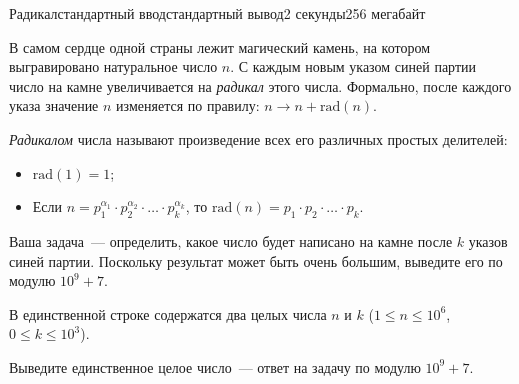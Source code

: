\begin{problem}{Радикал}{стандартный ввод}{стандартный вывод}{2 секунды}{256 мегабайт}

В самом сердце одной страны лежит магический камень, на котором выгравировано натуральное число $n$. С каждым новым указом синей партии число на камне увеличивается на \textit{радикал} этого числа. Формально, после каждого указа значение $n$ изменяется по правилу: $n \rightarrow n + \text{rad}(n)$.

\textit{Радикалом} числа называют произведение всех его различных простых делителей:
\begin{itemize}
\item $\text{rad}(1) = 1$;
\item Если $n = p_1^{\alpha_1}\cdot p_2^{\alpha_2}\cdot\ldots\cdot p_k^{\alpha_k}$, то $\text{rad}(n)=p_1 \cdot p_2\cdot\ldots\cdot p_k$.
\end{itemize}

Ваша задача~--- определить, какое число будет написано на камне после $k$ указов синей партии. Поскольку результат может быть очень большим, выведите его по модулю $10^9 + 7$.

\InputFile
В единственной строке содержатся два целых числа $n$ и $k$ ($1\le n\le 10^6$, $0\le k\le 10^3$).

\OutputFile
Выведите единственное целое число~--- ответ на задачу по модулю $10^9 + 7$.

\Examples

\begin{example}
%
%
\end{example}

\end{problem}

